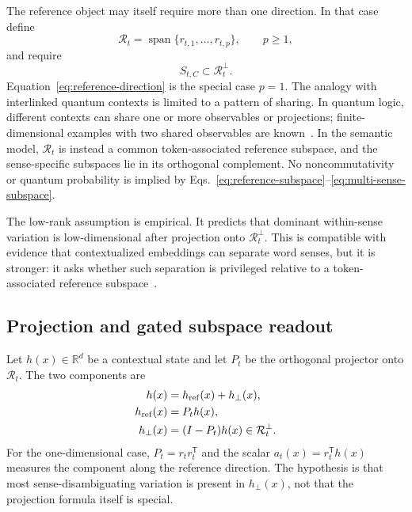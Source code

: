 \documentclass[
  aps,
  reprint,
  superscriptaddress,
  floatfix,
  nofootinbib,
  longbibliography
]{revtex4-2}
\newcommand{\R}{\mathbb{R}}
\newcommand{\T}{^{\mathsf{T}}}
\DeclareMathOperator{\spanop}{span}
\begin{document}
The reference object may itself require more than one direction. In that
case define
%
\begin{equation}
\label{eq:reference-subspace}
\mathcal R_t=
\spanop\{r_{t,1},\dots,r_{t,p}\},
\qquad p\ge1,
\end{equation}
%
and require
%
\begin{equation}
\label{eq:multi-sense-subspace}
S_{t,C}\subset\mathcal R_t^\perp .
\end{equation}
%
Equation~\eqref{eq:reference-direction} is the special case $p=1$.
The analogy with interlinked quantum contexts is limited to a pattern of
sharing. In quantum logic, different contexts can share one or more
observables or projections; finite-dimensional examples with two shared
observables are known~\cite{svozil:040102}. In the semantic model,
$\mathcal R_t$ is instead a common token-associated reference subspace, and
the sense-specific subspaces lie in its orthogonal complement. No
noncommutativity or quantum probability is implied by
Eqs.~\eqref{eq:reference-subspace}--\eqref{eq:multi-sense-subspace}.

The low-rank assumption is empirical. It predicts that dominant
within-sense variation is low-dimensional after projection onto
$\mathcal R_t^\perp$. This is compatible with evidence that contextualized
embeddings can separate word senses, but it is stronger: it asks whether
such separation is privileged relative to a token-associated reference
subspace~\cite{wiedemann2019does,scarlini2020ares}.

\subsection{Projection and gated subspace readout}
\label{sec:gated}

Let $h(x)\in\R^d$ be a contextual state and let $P_t$ be the orthogonal
projector onto $\mathcal R_t$. The two components are
%
\begin{align}
\label{eq:reference-decomp}
h(x)&=h_{\rm ref}(x)+h_\perp(x),\\
h_{\rm ref}(x)&=P_t h(x),\nonumber\\
h_\perp(x)&=(I-P_t)h(x)\in\mathcal R_t^\perp.\nonumber
\end{align}
%
For the one-dimensional case, $P_t=r_t r_t\T$ and the scalar
$a_t(x)=r_t\T h(x)$ measures the component along the reference direction.
The hypothesis is that most sense-disambiguating variation is present in
$h_\perp(x)$, not that the projection formula itself is special.
\end{document}
